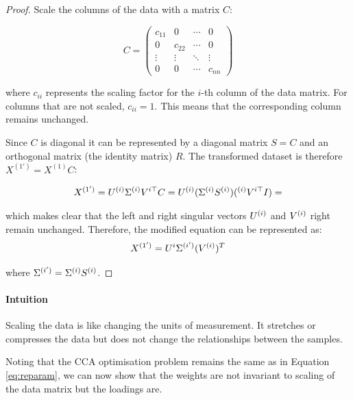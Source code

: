 \begin{proof}
    Scale the columns of the data with a matrix \( C \):

    \begin{equation}
        C = \begin{pmatrix}
                c_{11} & 0      & \cdots & 0      \\
                0      & c_{22} & \cdots & 0      \\
                \vdots & \vdots & \ddots & \vdots \\
                0      & 0      & \cdots & c_{nn}
        \end{pmatrix}
    \end{equation}

    where \( c_{ii} \) represents the scaling factor for the \( i \)-th column of the data matrix. For columns that are not scaled, \( c_{ii} = 1 \).
    This means that the corresponding column remains unchanged.

    Since $C$ is diagonal it can be represented by a diagonal matrix $S=C$ and an orthogonal matrix (the identity matrix) $R$.
    The transformed dataset is therefore \( X^{(1')} = X^{(1)}C \):

    \begin{align}
        X^{(1')} = U^{(i)}\Sigma^{(i)}V^{i\top}C = U^{(i)}(\Sigma^{(i)} S^{(i)}) (^{(i)}V^{i\top}I) =  \label{eq:scaled_data}
    \end{align}

    which makes clear that the left and right singular vectors \( U^{(i)} \) and \( V^{(i)} \) right remain unchanged.
    Therefore, the modified equation can be represented as:
    \begin{equation}
        X^{(1')} = U^i \Sigma^{(i')} (V^{(i)})^T \label{eq:modified_svd}
    \end{equation}

    where $\Sigma^{(i')}=\Sigma^{(i)} S^{(i)}$.
\end{proof}

\paragraph{Intuition}
Scaling the data is like changing the units of measurement.
It stretches or compresses the data but does not change the relationships between the samples.

Noting that the CCA optimisation problem remains the same as in Equation \ref{eq:reparam},
we can now show that the weights are not invariant to scaling of the data matrix but the \gls{loadings} are.

